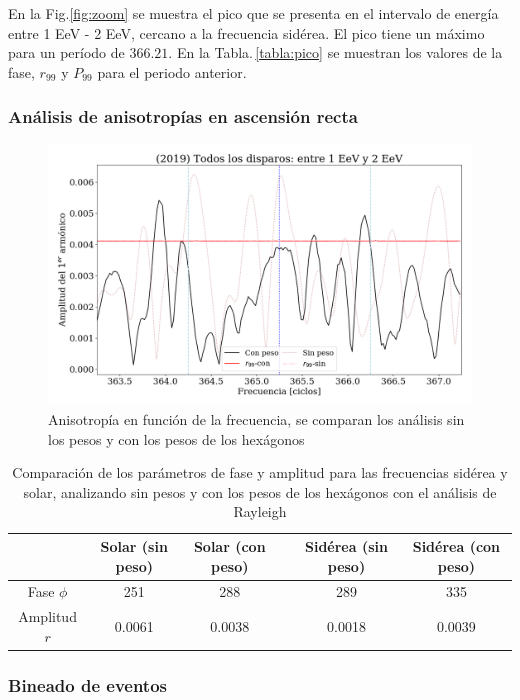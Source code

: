 			En la Fig.\ref{fig:zoom} se muestra el pico que se presenta en  el intervalo de energía entre 1 EeV - 2 EeV, cercano a la frecuencia sidérea. El pico tiene un máximo para un período de $366.21$. En la Tabla.\,\ref{tabla:pico} se muestran los valores de la fase, $r_{99}$ y $P_{99}$ para el periodo anterior.


	\subsubsection{Análisis de anisotropías en ascensión recta}
		
		\begin{figure}[H]
			\centering
			\includegraphics[width=0.75\linewidth]{pesos_sin_con_1_2_EeV.png}
			\caption{Anisotropía en función de la frecuencia, se comparan los análisis sin los pesos y con los pesos de los hexágonos}
		\end{figure}
		
		
		\begin{table}[H]
		\centering
		\begin{tabular}{c|c|c|c|c|c}
					& Solar (sin peso)	& Solar (con peso)	&& Sidérea (sin peso) 	& Sidérea (con peso)	 \\ \hline
		Fase $\phi$ & 251	    		& 288	    		&& 289				& 335				\\
		Amplitud $r$& 0.0061	    	& 0.0038	  		&&0.0018		& 0.0039			\\
		\end{tabular}
		\caption{Comparación de los parámetros de fase y amplitud para las frecuencias sidérea y solar, analizando sin pesos y con los pesos de los hexágonos con el análisis de Rayleigh}
		\end{table}


	\subsubsection{Bineado de eventos }


